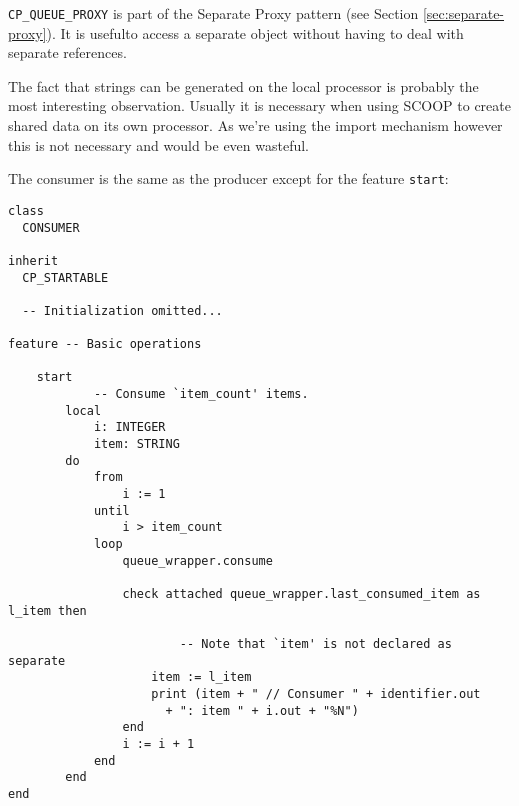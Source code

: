 \lstinline!CP_QUEUE_PROXY! is part of the Separate Proxy pattern  (see Section \ref{sec:separate-proxy}).
It is usefulto access a separate object without having to deal with separate references.

The fact that strings can be generated on the local processor is probably the most interesting observation.
Usually it is necessary when using SCOOP to create shared data on its own processor.
As we're using the import mechanism however this is not necessary and would be even wasteful.



The consumer is the same as the producer except for the feature \lstinline!start!:

\begin{lstlisting}[language=OOSC2Eiffel, captionpos=b, caption={The consumer class.}]
class
  CONSUMER
  
inherit
  CP_STARTABLE

  -- Initialization omitted...

feature -- Basic operations

	start
			-- Consume `item_count' items.
		local
			i: INTEGER
			item: STRING
		do
			from
				i := 1
			until
				i > item_count
			loop
				queue_wrapper.consume

				check attached queue_wrapper.last_consumed_item as l_item then

						-- Note that `item' is not declared as separate
					item := l_item
					print (item + " // Consumer " + identifier.out 
					  + ": item " + i.out + "%N")
				end
				i := i + 1
			end
		end
end
\end{lstlisting}

